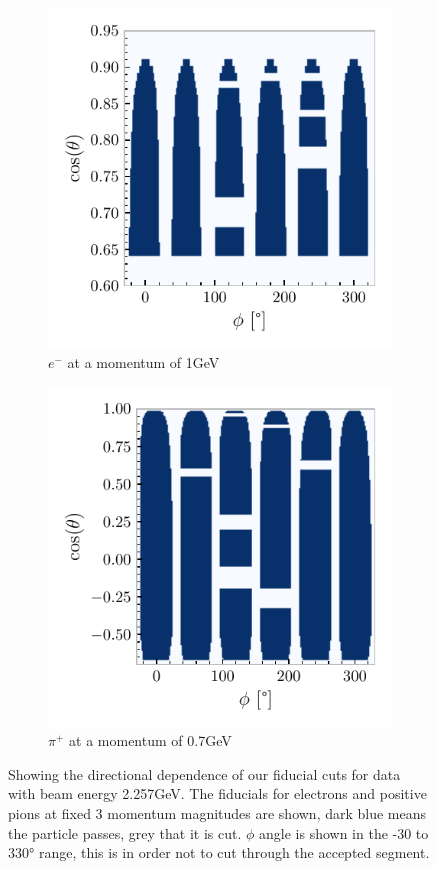\documentclass[a4paper,12pt]{article}
\begin{document}
\begin{figure}[H]
    \centering
    \begin{subfigure}[b]{0.45\textwidth}
        \centering
        \includegraphics{figures/python/el_fid.pdf}
        \caption{$e^-$ at a momentum of 1\si{GeV}}
    \end{subfigure}
    \hspace{0.5em}
    \begin{subfigure}[b]{0.45\textwidth}
        \centering
        \includegraphics{figures/python/pip_fid.pdf}
        \caption{$\pi^+$ at a momentum of 0.7\si{GeV}}
    \end{subfigure}
    \caption{
        Showing the directional dependence of our fiducial cuts for data with beam energy 2.257\si{GeV}.
        The fiducials for electrons and positive pions at fixed 3 momentum magnitudes are shown, dark blue means the particle passes, grey that it is cut.
        $\phi$ angle is shown in the -30 to 330\si{\degree} range, this is in order not to cut through the accepted segment.
    }\label{fig:fid_map}
\end{figure}
\end{document}

